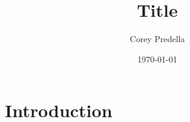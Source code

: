 \documentclass[12pt]{article}
\title{\titlefont Title}
\author{\titlefont Corey Predella}
\date{\faCalendar\space \bubble \today}
\begin{document}
\maketitle\thispagestyle{firststyle}



\section{Introduction}
\end{document}
